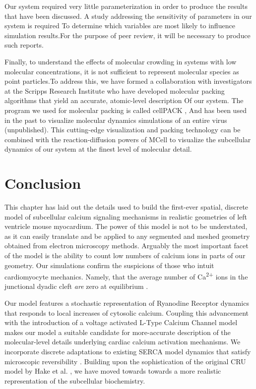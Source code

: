 \documentclass[12pt]{ucsddissertation}
\begin{document}
Our system required very little parameterization in order to produce the results that have been discussed. A study addressing the sensitivity of parameters in our system is required To determine which variables are most likely to influence simulation results.For the purpose of peer review, it will be necessary to produce such reports. 

Finally, to understand the effects of molecular crowding in systems with low molecular concentrations, it is not sufficient to represent molecular species as point particles.To address this, we have formed a collaboration with investigators at the Scripps Research Institute who have developed molecular packing algorithms that yield an accurate, atomic-level description Of our system. The program we used for molecular packing is called cellPACK \cite{Johnson2014}, And has been used in the past to visualize molecular dynamics simulations of an entire virus (unpublished). This cutting-edge visualization and packing technology can be combined with the reaction-diffusion powers of MCell to visualize the subcellular dynamics of our system at the finest level of molecular detail. 

\section{Conclusion}
This chapter has laid out the details used to build the first-ever spatial, discrete model of subcellular calcium signaling mechanisms in realistic geometries of left ventricle mouse myocardium. The power of this model is not to be understated, as it can easily translate and be applied to any segmented and meshed geometry obtained from electron microscopy methods. Arguably the most important facet of the model is the ability to count low numbers of calcium ions in parts of our geometry. Our simulations confirm the suspicions of those who intuit cardiomyocyte mechanics. Namely, that the average number of Ca\textsuperscript{2+} ions in the junctional dyadic cleft \textit{are} zero at equilibrium \cite{Bers2002}.

Our model features a stochastic representation of Ryanodine Receptor dynamics that responds to local increases of cytosolic calcium. Coupling this advancement with the introduction of a voltage activated L-Type Calcium Channel model makes our model a suitable candidate for more-accurate description of the molecular-level details underlying cardiac calcium activation mechanisms. We incorporate discrete adaptations to existing SERCA model dynamics that satisfy microscopic reversibility \cite{Higgins2006}. Building upon the sophistication of the original CRU model by Hake et al. \cite{Hake2012}, we have moved towards towards a more realistic representation of the subcellular biochemistry. 
\end{document}
